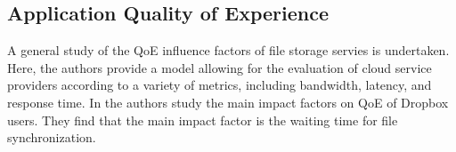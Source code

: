 \subsection{Application Quality of Experience}\label{sec:application:background:application_qoe}

A general study of the \gls{QoE} influence factors of file storage servies is undertaken.
Here, the authors provide a model allowing for the evaluation of cloud service providers according to a variety of metrics, including bandwidth, latency, and response time.
In the authors study the main impact factors on \gls{QoE} of Dropbox users.
They find that the main impact factor is the waiting time for file synchronization.